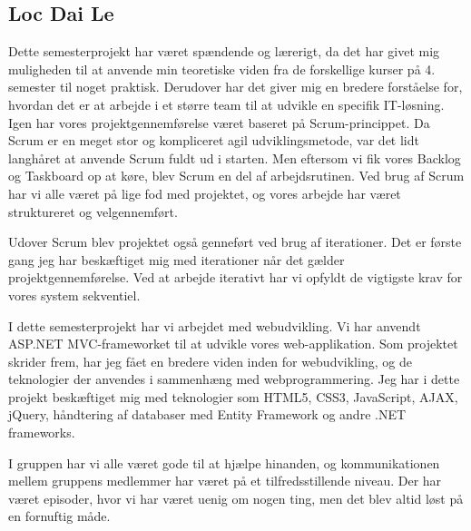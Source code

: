 \subsection*{Loc Dai Le}

Dette semesterprojekt har været spændende og lærerigt, da det har givet mig muligheden til at anvende min teoretiske viden fra de forskellige kurser på 4. semester til noget praktisk. Derudover har det giver mig en bredere forståelse for, hvordan det er at arbejde i et større team til at udvikle en specifik IT-løsning. 
Igen har vores projektgennemførelse været baseret på Scrum-princippet. Da Scrum er en meget stor og kompliceret agil udviklingsmetode, var det lidt langhåret at anvende Scrum fuldt ud i starten. Men eftersom vi fik vores Backlog og Taskboard op at køre, blev Scrum en del af arbejdsrutinen.   
Ved brug af Scrum har vi alle været på lige fod med projektet, og vores arbejde har været struktureret og velgennemført.

Udover Scrum blev projektet også genneført ved brug af iterationer. Det er første gang jeg har beskæftiget mig med iterationer når det gælder projektgennemførelse. Ved at arbejde iterativt har vi opfyldt de vigtigste krav for vores system sekventiel. 

I dette semesterprojekt har vi arbejdet med webudvikling. Vi har anvendt ASP.NET MVC-frameworket til at udvikle vores web-applikation. Som projektet skrider frem, har jeg fået en bredere viden inden for webudvikling, og de teknologier der anvendes i sammenhæng med webprogrammering. Jeg har i dette projekt beskæftiget mig med teknologier som HTML5, CSS3, JavaScript, AJAX, jQuery, håndtering af databaser med Entity Framework og andre .NET frameworks. 


I gruppen har vi alle været gode til at hjælpe hinanden, og kommunikationen mellem gruppens medlemmer har været på et tilfredsstillende niveau. Der har været episoder, hvor vi har været uenig om nogen ting, men det blev altid løst på en fornuftig måde. 